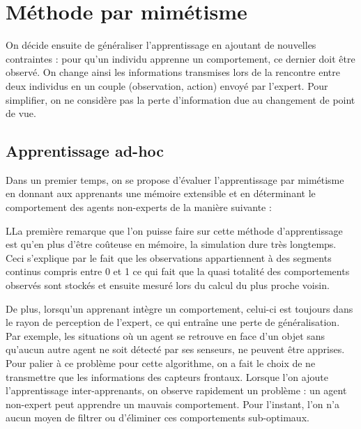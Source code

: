 \documentclass[a4paper, 12pt]{report}
\begin{document}
    
    
    
	\section{Méthode par mimétisme}
	On décide ensuite de généraliser l'apprentissage en ajoutant de nouvelles contraintes : pour qu'un individu apprenne un comportement, ce dernier doit être observé. On change ainsi les informations transmises lors de la rencontre entre deux individus en un couple (observation, action) envoyé par l'expert.
	Pour simplifier, on ne considère pas la perte d'information due au changement de point de vue.
	\subsection{Apprentissage ad-hoc}
	Dans un premier temps, on se propose d'évaluer l'apprentissage par mimétisme en donnant aux apprenants une mémoire extensible et en déterminant le comportement des agents non-experts de la manière suivante :

	
	LLa première remarque que l'on puisse faire sur cette méthode d'apprentissage est qu'en plus d'être coûteuse en mémoire, la simulation dure très longtemps. Ceci s'explique par le fait que les observations appartiennent à des segments continus compris entre 0 et 1 ce qui fait que la quasi totalité des comportements observés sont stockés et ensuite mesuré lors du calcul du plus proche voisin.
	
	De plus, lorsqu'un apprenant intègre un comportement, celui-ci est toujours dans le rayon de perception de l'expert, ce qui entraîne une perte de généralisation. Par exemple, les situations où un agent se retrouve en face d'un objet sans qu'aucun autre agent ne soit détecté par ses senseurs, ne peuvent être apprises.
	Pour palier à ce problème pour cette algorithme, on a fait le choix de ne transmettre que les informations des capteurs frontaux.
	Lorsque l'on ajoute l'apprentissage inter-apprenants, on observe rapidement un problème : un agent non-expert peut apprendre un mauvais comportement. Pour l'instant, l'on n'a aucun moyen de filtrer ou d'éliminer ces comportements sub-optimaux.
	
\end{document}

